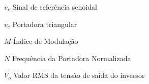 \begin{simbolos}
  \item[$ v_r $] Sinal de referência senoidal
  \item[$ v_c $] Portadora triangular
  \item[$ M $] Índice de Modulação
  \item[$ N $] Frequência da Portadora Normalizada
  \item[$ V_o $] Valor RMS da tensão de saída do inversor
  
\end{simbolos}
